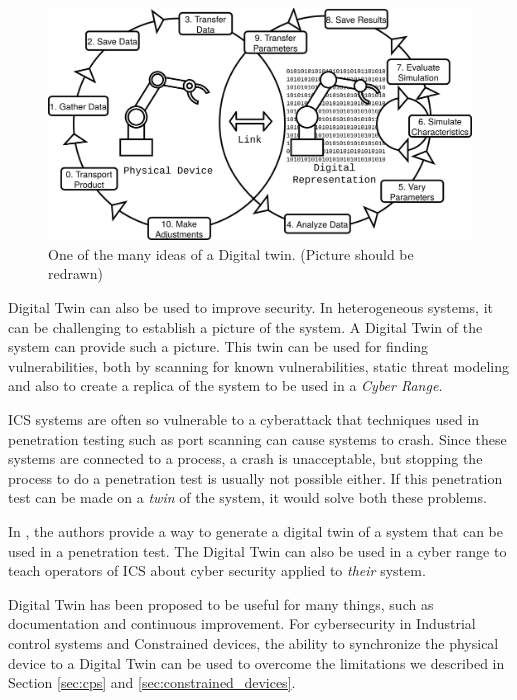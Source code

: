 \begin{figure}[h]
\centering
\includegraphics[width=\textwidth]{images/digital_twin.png}
\caption{One of the many ideas of a Digital twin. (Picture should be redrawn)}
\label{fig:digital-twin}
\end{figure}

Digital Twin can also be used to improve security. In heterogeneous systems, it can be challenging to establish a picture of the system. A Digital Twin of the system can provide such a picture. This twin can be used for finding vulnerabilities, both by scanning for known vulnerabilities, static threat modeling and also to create a replica of the system to be used in a \textit{Cyber Range}. 

ICS systems are often so vulnerable to a cyberattack that techniques used in penetration testing such as port scanning can cause systems to crash. Since these systems are connected to a process, a crash is unacceptable, but stopping the process to do a penetration test is usually not possible either. If this penetration test can be made on a \emph{twin} of the system, it would solve both these problems. 

In \cite{bitton2018deriving}, the authors provide a way to generate a digital twin of a system that can be used in a penetration test. The Digital Twin can also be used in a cyber range to teach operators of ICS about cyber security applied to \emph{their} system.

Digital Twin has been proposed to be useful for many things, such as documentation and continuous improvement. For cybersecurity in Industrial control systems and Constrained devices, the ability to synchronize the physical device to a Digital Twin can be used to overcome the limitations we described in Section \ref{sec:cps} and \ref{sec:constrained_devices}.


